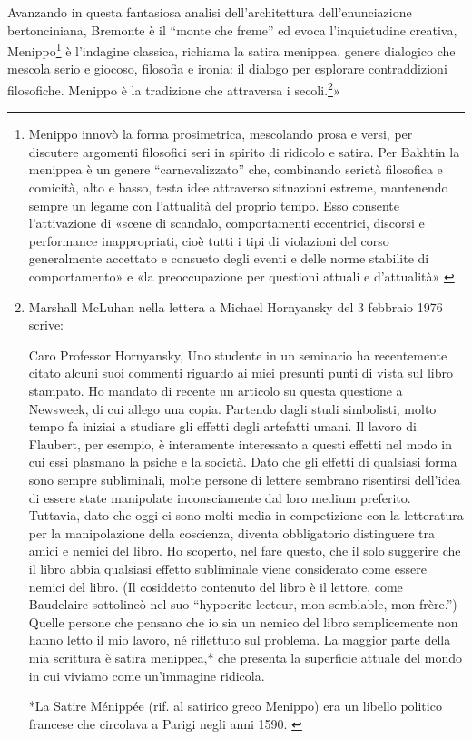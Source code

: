 Avanzando in questa fantasiosa analisi dell'architettura dell'enunciazione
bertonciniana, Bremonte è il “monte che freme” ed evoca l'inquietudine creativa,
Menippo\footnote{%
  Menippo innovò la forma prosimetrica, mescolando prosa e versi,
  per discutere argomenti filosofici seri in spirito di ridicolo e satira. Per
  Bakhtin la menippea è un genere “carnevalizzato” che, combinando serietà
  filosofica e comicità, alto e basso, testa idee attraverso situazioni
  estreme, mantenendo sempre un legame con l'attualità del proprio tempo. Esso
  consente l'attivazione di «scene di scandalo, comportamenti eccentrici,
  discorsi e performance inappropriati, cioè tutti i tipi di violazioni del
  corso generalmente accettato e consueto degli eventi e delle norme stabilite
  di comportamento» e «la preoccupazione per questioni attuali e d'attualità» \cite{bakhtin84}
}%
è l'indagine classica, richiama la satira menippea, genere dialogico che mescola
serio e giocoso, filosofia e ironia: il dialogo per esplorare contraddizioni
filosofiche. Menippo è la tradizione che attraversa i secoli.\footnote{%
  Marshall McLuhan nella lettera a Michael Hornyansky del  3 febbraio 1976 scrive:

  Caro Professor Hornyansky,
  Uno studente in un seminario ha recentemente citato alcuni suoi commenti
  riguardo ai miei presunti punti di vista sul libro stampato. Ho mandato di
  recente un articolo su questa questione a Newsweek, di cui allego una copia.
  Partendo dagli studi simbolisti, molto tempo fa iniziai a studiare gli effetti
  degli artefatti umani. Il lavoro di Flaubert, per esempio, è interamente
  interessato a questi effetti nel modo in cui essi plasmano la psiche e la
  società. Dato che gli effetti di qualsiasi forma sono sempre subliminali,
  molte persone di lettere sembrano risentirsi dell'idea di essere state
  manipolate inconsciamente dal loro medium preferito. Tuttavia, dato che oggi
  ci sono molti media in competizione con la letteratura per la manipolazione
  della coscienza, diventa obbligatorio distinguere tra amici e nemici del
  libro. Ho scoperto, nel fare questo, che il solo suggerire che il libro abbia
  qualsiasi effetto subliminale viene considerato come essere nemici del libro.
  (Il cosiddetto contenuto del libro è il lettore, come Baudelaire sottolineò
  nel suo “hypocrite lecteur, mon semblable, mon frère.”) Quelle persone che
  pensano che io sia un nemico del libro semplicemente non hanno letto il mio
  lavoro, né riflettuto sul problema. La maggior parte della mia scrittura è
  satira menippea,* che presenta la superficie attuale del mondo in cui viviamo
  come un'immagine ridicola.

  *La Satire Ménippée (rif. al satirico greco Menippo) era un libello politico
  francese che circolava a Parigi negli anni 1590. \cite{mcluhan87}
}»

